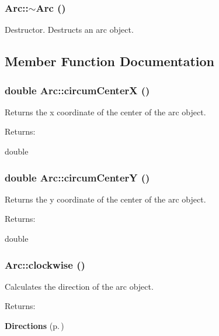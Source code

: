 \subsubsection{\setlength{\rightskip}{0pt plus 5cm}Arc::$\sim$Arc ()}\label{classArc_a2}


Destructor. Destructs an arc object. 

\subsection{Member Function Documentation}
\subsubsection{\setlength{\rightskip}{0pt plus 5cm}double Arc::circum\-Center\-X ()\hspace{0.3cm}{\tt  [protected]}}\label{classArc_b1}


Returns the x coordinate of the center of the arc object. \begin{Desc}
\item[Returns: ]\par
double \end{Desc}
\subsubsection{\setlength{\rightskip}{0pt plus 5cm}double Arc::circum\-Center\-Y ()\hspace{0.3cm}{\tt  [protected]}}\label{classArc_b2}


Returns the y coordinate of the center of the arc object. \begin{Desc}
\item[Returns: ]\par
double \end{Desc}
\subsubsection{ Arc::clockwise ()\hspace{0.3cm}{\tt  [protected]}}\label{classArc_b3}


Calculates the direction of the arc object. \begin{Desc}
\item[Returns: ]\par
{\bf Directions} {\rm (p.\,\pageref{classArc_s4})} \end{Desc}
